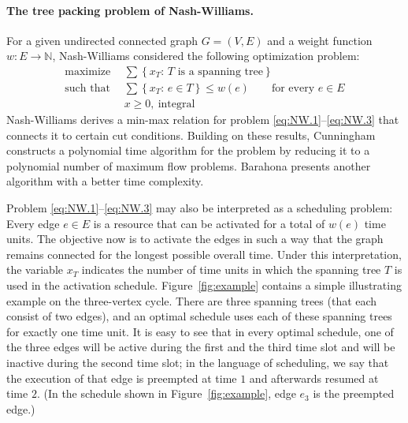 \documentclass[runningheads]{llncs}
\newcommand{\NN}{\mathbb{N}}
\begin{document}
\paragraph{The tree packing problem of Nash-Williams.}
For a given undirected connected graph $G=(V,E)$ and a weight function $w:E\to\NN$,
Nash-Williams \cite{Nash-Williams1961} considered the following optimization problem:
\begin{align}
\text{maximize}~~ &\sum\left\{x_T:\,\text{$T$ is a spanning tree} \right\} 
\label{eq:NW.1} \\[0.5ex]
\text{such that}~~&\sum\left\{x_T:\,e\in T\right\}\le w(e)\qquad\text{for every $e\in E$}
\label{eq:NW.2} \\[0.5ex]
                 &x\ge0,~\text{integral}
\label{eq:NW.3} 
\end{align}
Nash-Williams \cite{Nash-Williams1961} derives a min-max relation for problem
\eqref{eq:NW.1}--\eqref{eq:NW.3} that connects it to certain cut conditions.
Building on these results, Cunningham \cite{Cunningham1985} constructs a polynomial time 
algorithm for the problem by reducing it to a polynomial number of maximum flow problems.
Barahona \cite{Barahona1995} presents another algorithm with a better time complexity.

Problem \eqref{eq:NW.1}--\eqref{eq:NW.3} may also be interpreted as a scheduling problem:
Every edge $e\in E$ is a resource that can be activated for a total of $w(e)$ time units.
The objective now is to activate the edges in such a way that the graph remains connected 
for the longest possible overall time. 
Under this interpretation, the variable $x_T$ indicates the number of time units in which
the spanning tree $T$ is used in the activation schedule.
Figure~\ref{fig:example} contains a simple illustrating example on the three-vertex cycle.
There are three spanning trees (that each consist of two edges), and an optimal schedule 
uses each of these spanning trees for exactly one time unit.
It is easy to see that in every optimal schedule, one of the three edges will be active 
during the first and the third time slot and will be inactive during the second time slot;
in the language of scheduling, we say that the execution of that edge is preempted 
at time $1$ and afterwards resumed at time $2$.
(In the schedule shown in Figure~\ref{fig:example}, edge $e_3$ is the preempted edge.)
\end{document}
